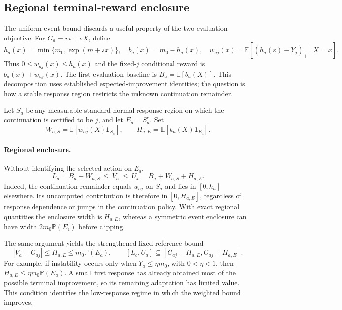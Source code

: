 \subsection{Regional terminal-reward enclosure}\label{sec:regional_value}

The uniform event bound discards a useful property of the two-evaluation objective. For $G_a=m+sX$, define
\begin{equation}
h_a(x)=\min\{m_0,\exp(m+sx)\},\quad
b_a(x)=m_0-h_a(x),\quad
w_{aj}(x)=\mathbb E[(h_a(x)-Y_j)_+\mid X=x].
\label{eq:regional_decomposition}
\end{equation}
Thus $0\le w_{aj}(x)\le h_a(x)$ and the fixed-$j$ conditional reward is $b_a(x)+w_{aj}(x)$. The first-evaluation baseline is $B_a=\mathbb E[b_a(X)]$. This decomposition uses established expected-improvement identities; the question is how a stable response region restricts the unknown continuation remainder.

Let $S_a$ be any measurable standard-normal response region on which the continuation is certified to be $j$, and let $E_a=S_a^c$. Set
\begin{equation}
W_{a,S}=\mathbb E[w_{aj}(X)\mathbf1_{S_a}],\qquad
H_{a,E}=\mathbb E[h_a(X)\mathbf1_{E_a}].
\label{eq:regional_quantities}
\end{equation}
\paragraph{Regional enclosure.}
Without identifying the selected action on $E_a$,
\begin{equation}
L_a=B_a+W_{a,S}\ \le\ V_a\ \le\
U_a=B_a+W_{a,S}+H_{a,E}.
\label{eq:regional_enclosure}
\end{equation}
Indeed, the continuation remainder equals $w_{aj}$ on $S_a$ and lies in $[0,h_a]$ elsewhere. Its uncomputed contribution is therefore in $[0,H_{a,E}]$, regardless of response dependence or jumps in the continuation policy. With exact regional quantities the enclosure width is $H_{a,E}$, whereas a symmetric event enclosure can have width $2m_0\mathbb P(E_a)$ before clipping.

The same argument yields the strengthened fixed-reference bound
\begin{equation}
|V_a-G_{aj}|\le H_{a,E}\le m_0\mathbb P(E_a),\qquad
[L_a,U_a]\subseteq[G_{aj}-H_{a,E},G_{aj}+H_{a,E}].
\label{eq:regional_weighted_event}
\end{equation}
For example, if instability occurs only when $Y_a\le\eta m_0$, with $0<\eta<1$, then $H_{a,E}\le\eta m_0\mathbb P(E_a)$. A small first response has already obtained most of the possible terminal improvement, so its remaining adaptation has limited value. This condition identifies the low-response regime in which the weighted bound improves.


